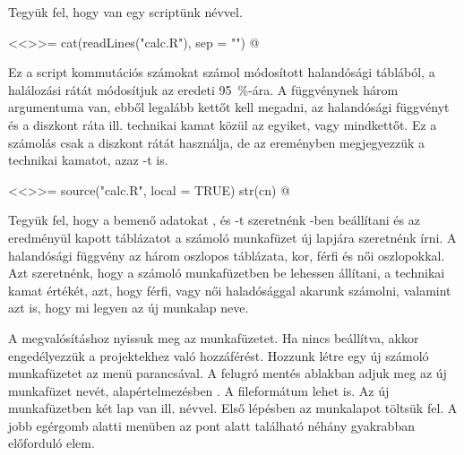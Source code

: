 Tegyük fel, hogy van egy  scriptünk  névvel.
\begin{Rnw}
<<>>=
cat(readLines("calc.R"), sep = "\n")
@  
\end{Rnw}
Ez a script kommutációs számokat számol módosított halandósági
táblából, a halálozási 
rátát módosítjuk az eredeti 95~\%-ára. A  függvénynek
három argumentuma van, 
ebből legalább kettőt kell megadni, az  halandósági függvényt és a  diszkont ráta ill.
 technikai kamat közül az egyiket, vagy mindkettőt. Ez a
számolás csak a diszkont rátát 
használja, de az ereményben megjegyezzük a technikai kamatot, azaz
-t is.
\begin{Rnw}
<<>>=
source("calc.R", local = TRUE)
str(cn)
@
\end{Rnw}
Tegyük fel, hogy a bemenő adatokat ,  és -t
szeretnénk -ben beállítani és az 
eredményül kapott táblázatot a számoló munkafüzet új lapjára
szeretnénk írni. A  halandósági függvény az  három oszlopos
táblázata, kor, férfi és női oszlopokkal. Azt 
szeretnénk, hogy a számoló munkafüzetben be lehessen állítani, a
technikai kamat értékét, 
azt, hogy férfi, vagy női haladósággal akarunk számolni, valamint azt
is, hogy mi legyen az 
új munkalap neve.

A megvalósításhoz nyissuk meg az  munkafüzetet. Ha
nincs beállítva, akkor engedélyezzük a 
projektekhez való hozzáférést. Hozzunk létre egy új számoló 
munkafüzetet az  menü 
parancsával. A felugró 
mentés ablakban adjuk meg az új munkafüzet nevét, alapértelmezésben
. A fileformátum lehet  is. Az új
munkafüzetben két lap van  ill.  névvel. 
Első lépésben az  munkalapot töltsük fel. A jobb egérgomb
alatti menüben az 
 pont alatt található néhány gyakrabban előforduló elem.

